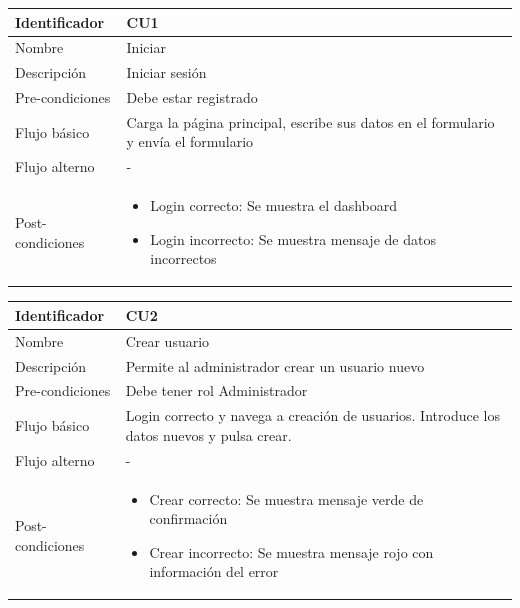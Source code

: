 \vspace{1em}
\par
\begin{tabular}{||p{3cm}|p{11cm}||} 
\hline
Identificador & CU1 \\ [0.5ex] 
\hline\hline
Nombre & Iniciar \\ 
\hline
Descripción & Iniciar sesión \\
\hline
Pre-condiciones & Debe estar registrado \\
\hline
Flujo básico & Carga la página principal, escribe sus datos en el formulario
y envía el formulario \\
\hline
Flujo alterno & - \\
\hline
Post-condiciones &
\begin{itemize}
    \item Login correcto: Se muestra el dashboard
    \item Login incorrecto: Se muestra mensaje de datos incorrectos
\end{itemize} \\
\hline
\end{tabular}

\vspace{1em}
\par
\begin{tabular}{||p{3cm}|p{11cm}||} 
\hline
Identificador & CU2 \\ [0.5ex] 
\hline\hline
Nombre & Crear usuario \\ 
\hline
Descripción & Permite al administrador crear un usuario nuevo \\
\hline
Pre-condiciones & Debe tener rol Administrador \\
\hline
Flujo básico & Login correcto y navega a creación de usuarios. Introduce los datos nuevos y pulsa crear. \\
\hline
Flujo alterno & - \\
\hline
Post-condiciones &
\begin{itemize}
    \item Crear correcto: Se muestra mensaje verde de confirmación
    \item Crear incorrecto: Se muestra mensaje rojo con información del error
\end{itemize} \\
\hline
\end{tabular}

